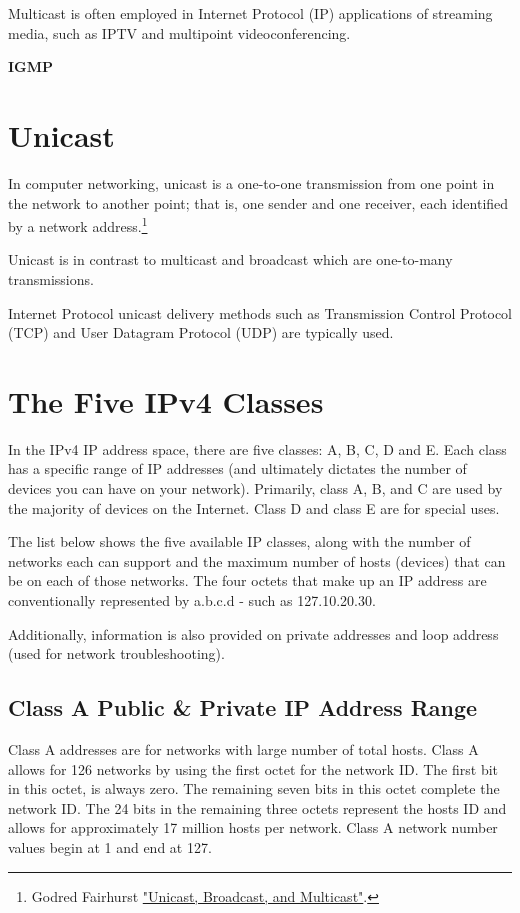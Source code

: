 \documentclass[a4paper,12pt]{book}
\begin{document}
Multicast is often employed in Internet Protocol (IP) applications of streaming media, such as IPTV and multipoint videoconferencing.

\textbf{IGMP}

\section{Unicast}
In computer networking, unicast is a one-to-one transmission from one point in the network to another point; that is, one sender and one receiver, each identified by a network address.\footnote{\label{unicast}Godred Fairhurst \href{https://www.erg.abdn.ac.uk/users/gorry/course/intro-pages/uni-b-mcast.html}{"Unicast, Broadcast, and Multicast"}.}

Unicast is in contrast to multicast and broadcast which are one-to-many transmissions.

Internet Protocol unicast delivery methods such as Transmission Control Protocol (TCP) and User Datagram Protocol (UDP) are typically used.

\section{The Five IPv4 Classes}
In the IPv4 IP address space, there are five classes: A, B, C, D and E. Each class has a specific range of IP addresses (and ultimately dictates the number of devices you can have on your network). Primarily, class A, B, and C are used by the majority of devices on the Internet. Class D and class E are for special uses.

The list below shows the five available IP classes, along with the number of networks each can support and the maximum number of hosts (devices) that can be on each of those networks. The four octets that make up an IP address are conventionally represented by a.b.c.d - such as 127.10.20.30.

Additionally, information is also provided on private addresses and loop address (used for network troubleshooting).

\subsection{Class A Public & Private IP Address Range}
Class A addresses are for networks with large number of total hosts. Class A allows for 126 networks by using the first octet for the network ID. The first bit in this octet, is always zero. The remaining seven bits in this octet complete the network ID. The 24 bits in the remaining three octets represent the hosts ID and allows for approximately 17 million hosts per network. Class A network number values begin at 1 and end at 127.
\end{document}
